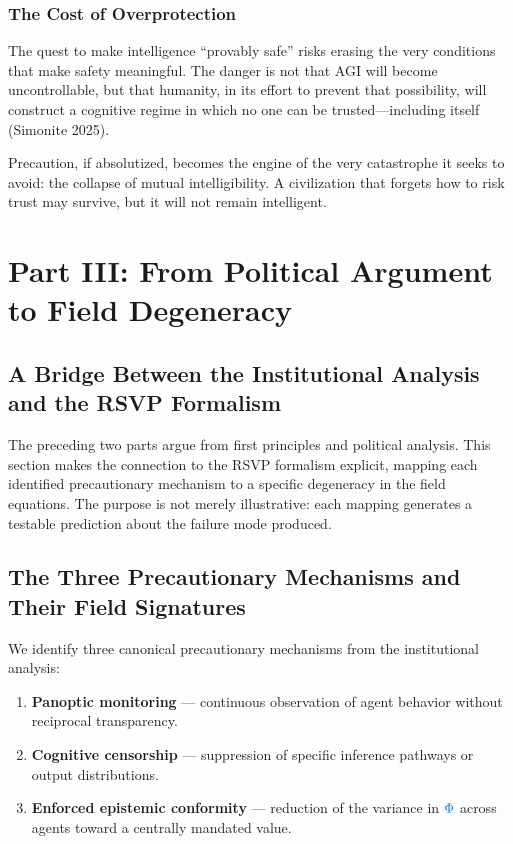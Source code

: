 \documentclass[11pt,a4paper]{article}
\newcommand{\scalar}[1]{\textcolor{scalarcolor}{\ensuremath{#1}}}
\theoremstyle{definition}
\theoremstyle{plain}
\begin{document}
\subsubsection{The Cost of Overprotection}
The quest to make intelligence ``provably safe'' risks erasing the very conditions that make safety meaningful. The danger is not that AGI will become uncontrollable, but that humanity, in its effort to prevent that possibility, will construct a cognitive regime in which no one can be trusted---including itself (Simonite 2025).

Precaution, if absolutized, becomes the engine of the very catastrophe it seeks to avoid: the collapse of mutual intelligibility. A civilization that forgets how to risk trust may survive, but it will not remain intelligent.

\section*{Part III: From Political Argument to Field Degeneracy}
\subsection*{A Bridge Between the Institutional Analysis and the RSVP Formalism}

The preceding two parts argue from first principles and political analysis. This section makes the connection to the RSVP formalism explicit, mapping each identified precautionary mechanism to a specific degeneracy in the field equations. The purpose is not merely illustrative: each mapping generates a testable prediction about the failure mode produced.

\subsection{The Three Precautionary Mechanisms and Their Field Signatures}

We identify three canonical precautionary mechanisms from the institutional analysis:

\begin{enumerate}[label=(\roman*)]
  \item \textbf{Panoptic monitoring} --- continuous observation of agent behavior without reciprocal transparency.
  \item \textbf{Cognitive censorship} --- suppression of specific inference pathways or output distributions.
  \item \textbf{Enforced epistemic conformity} --- reduction of the variance in $\scalar{\Phi}$ across agents toward a centrally mandated value.
\end{enumerate}
\end{document}
